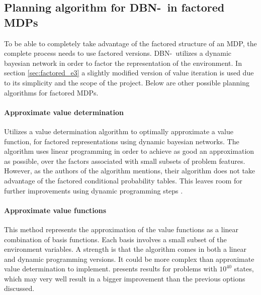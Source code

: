 \subsection{Planning algorithm for DBN-\etre\ in factored MDPs}
\label{sec:better_planing_algos}

To be able to completely take advantage of the factored structure of an MDP, the complete
process needs to use factored versions. DBN-\etre\ utilizes a dynamic
bayesian network in order to factor the representation of the environment. In
section \ref{sec:factored_e3} a slightly modified version of value iteration is
used due to its simplicity and the scope of the project. Below are other
possible planning algorithms for factored MDPs.

\paragraph{Approximate value determination}

Utilizes a value determination algorithm to optimally approximate a value
function, for factored representations using dynamic bayesian networks. The
algorithm uses linear programming in order to achieve as good an approximation
as possible, over the factors associated with small subsets of problem
features. However, as the authors of the algorithm mentions, their algorithm
does not take advantage of the factored conditional probability tables. This
leaves room for further improvements using dynamic programming steps
\parencite{koller1999computing}.

\paragraph{Approximate value functions}

This method represents the approximation of the value functions as a linear
combination of basis functions. Each basis involves a small subset of the
environment variables. A strength is that the algorithm comes in both a linear
and dynamic programming versions. It could be more complex than approximate
value determination to implement. \textcite{guestrin2003efficient} presents
results for problems with $10^{40}$ states, which may very well result in a
bigger improvement than the previous options discussed.
